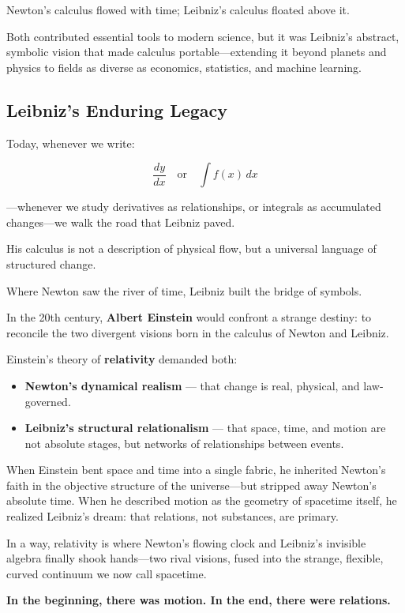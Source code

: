Newton’s calculus flowed with time; Leibniz’s calculus floated above it.

Both contributed essential tools to modern science, but it was Leibniz’s abstract, symbolic vision that made calculus portable—extending it beyond planets and physics to fields as diverse as economics, statistics, and machine learning.

\subsection{Leibniz’s Enduring Legacy}

Today, whenever we write:

\[
\frac{dy}{dx}
\quad \text{or} \quad
\int f(x)\,dx
\]

—whenever we study derivatives as relationships, or integrals as accumulated changes—we walk the road that Leibniz paved.

His calculus is not a description of physical flow, but a universal language of structured change.

Where Newton saw the river of time, Leibniz built the bridge of symbols.

\begin{tcolorbox}[colback=gray!5!white, colframe=black, title=\textbf{Philosophical Footnote: Einstein and the Reunion of Newton and Leibniz}, fonttitle=\bfseries, arc=1.5mm, boxrule=0.4pt]

  In the 20th century, \textbf{Albert Einstein} would confront a strange destiny: to reconcile the two divergent visions born in the calculus of Newton and Leibniz.

  \medskip
  
  Einstein’s theory of \textbf{relativity} demanded both:

  \medskip
  
  \begin{itemize}
      \item \textbf{Newton’s dynamical realism} — that change is real, physical, and law-governed.
      \item \textbf{Leibniz’s structural relationalism} — that space, time, and motion are not absolute stages, but networks of relationships between events.
  \end{itemize}

  \medskip
  
  When Einstein bent space and time into a single fabric, he inherited Newton’s faith in the objective structure of the universe—but stripped away Newton’s absolute time.  When he described motion as the geometry of spacetime itself, he realized Leibniz’s dream: that relations, not substances, are primary.
  
  \medskip
  
  In a way, relativity is where Newton’s flowing clock and Leibniz’s invisible algebra finally shook hands—two rival visions, fused into the strange, flexible, curved continuum we now call spacetime.
  
  \medskip
  
  \textbf{In the beginning, there was motion. In the end, there were relations.}

\end{tcolorbox}

